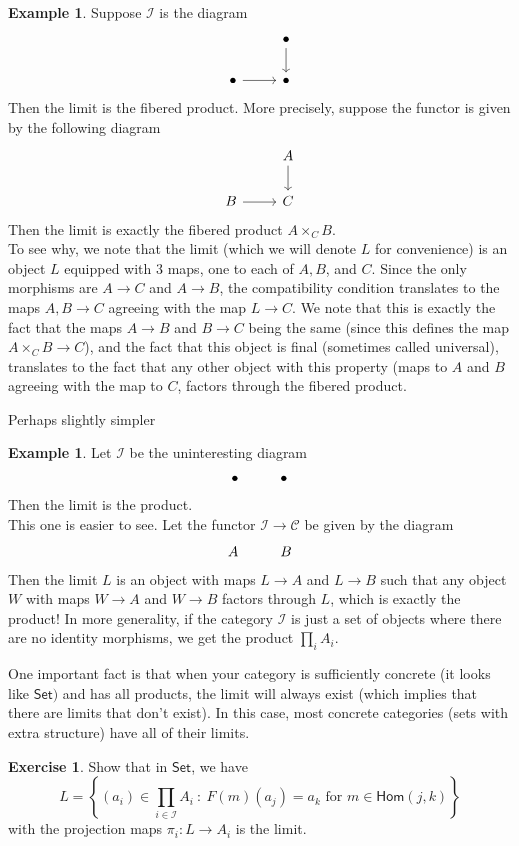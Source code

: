 \documentclass[psamsfonts]{amsart}
\theoremstyle{definition}
\newtheorem{exmp}[thm]{Example}
\newtheorem{exer}[thm]{Exercise}
\theoremstyle{remark}
\renewcommand{\hom}{\mathsf{Hom}}
\newcommand{\set}[1]{\left\lbrace #1 \right\rbrace}
\begin{document}
\begin{exmp}
Suppose $\mathscr{I}$ is the diagram
$$\begin{tikzcd}
& \bullet \arrow[d] \\
\bullet \arrow[r] & \bullet
\end{tikzcd}$$
Then the limit is the fibered product. More precisely, suppose the functor is given by the following diagram
$$\begin{tikzcd}
& A \arrow[d]\\
B \arrow[r] & C
\end{tikzcd}$$
Then the limit is exactly the fibered product $A \times_C B$. \\

To see why, we note that the limit (which we will denote $L$ for convenience) is an object $L$ equipped with $3$ maps, one to each of $A,B$, and $C$. Since the only morphisms are $A \to C$ and $A \to B$, the compatibility condition translates to the maps $A,B \to C$ agreeing with the map $L \to C$. We note that this is exactly the fact that the maps $A \to B$ and $B \to C$ being the same (since this defines the map $A \times_C B \to C$), and the fact that this object is final (sometimes called universal), translates to the fact that any other object with this property (maps to $A$ and $B$ agreeing with the map to $C$, factors through the fibered product.
\end{exmp}
Perhaps slightly simpler
\begin{exmp}
Let $\mathscr{I}$ be the uninteresting diagram
$$\xymatrix{
\bullet & \bullet
}$$
Then the limit is the product. \\

This one is easier to see. Let the functor $\mathscr{I} \to \mathscr{C}$ be given by the diagram
$$\xymatrix{
A & B
} $$
Then the limit $L$ is an object with maps $L \to A$ and $L \to B$ such that any object $W$ with maps $W \to A$ and $W \to B$ factors through $L$, which is exactly the product! In more generality, if the category $\mathscr{I}$ is just a set of objects where there are no identity morphisms, we get the product $\prod_i A_i$. \\
\end{exmp}
%
One important fact is that when your category is sufficiently concrete (it looks like $\mathsf{Set})$ and has all products, the limit will always exist (which implies that there are limits that don't exist). In this case, most concrete categories (sets with extra structure) have all of their limits.
%
\begin{exer}
Show that in $\mathsf{Set}$, we have
$$L = \set{(a_i) \in \prod_{i \in \mathscr{I}} A_i ~\colon~ F(m)(a_j) = a_k \text{ for } m \in \hom(j,k)}$$
with the projection maps $\pi_i: L \to A_i$ is the limit.
\end{exer}
\end{document}
